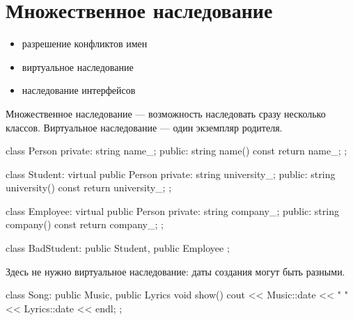 \section{Множественное наследование}
\begin{itemize}[noitemsep]
    \item разрешение конфликтов имен
    \item виртуальное наследование
    \item наследование интерфейсов
\end{itemize}
Множественное наследование --- возможность  наследовать сразу несколько классов.
Виртуальное наследование --- один экземпляр родителя.
\begin{cppcode}
    class Person {
	private:
	string name_;
	public:
	string name() const { return name_; }
    };

    class Student: virtual public Person {
	private:
	string university_;
	public:
	string university() const { return university_; }
    };

    class Employee: virtual public Person {
	private:
	string company_;
	public:
	string company() const { return company_; }
    };

    class BadStudent: public Student, public Employee {};
\end{cppcode}
Здесь не нужно виртуальное наследование: даты создания могут быть разными.
\begin{cppcode}
    class Song: public Music, public Lyrics {
	void show() { cout << Music::date << " " << Lyrics::date << endl; }
    };
\end{cppcode}
